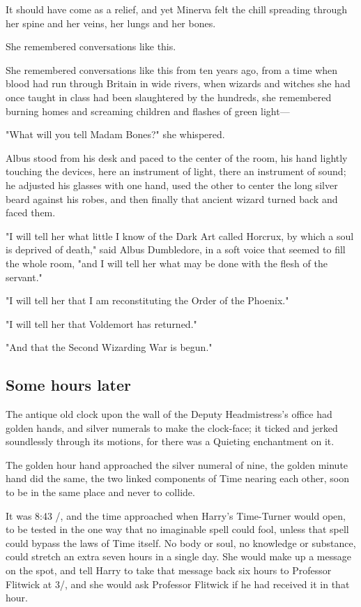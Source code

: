 It should have come as a relief, and yet Minerva felt the chill spreading
through her spine and her veins, her lungs and her bones.

She remembered conversations like this.

She remembered conversations like this from ten years ago, from a time when
blood had run through Britain in wide rivers, when wizards and witches she had
once taught in class had been slaughtered by the hundreds, she remembered
burning homes and screaming children and flashes of green light\mbox{---}

"What will you tell Madam Bones?" she whispered.

Albus stood from his desk and paced to the center of the room, his hand lightly
touching the devices, here an instrument of light, there an instrument of
sound; he adjusted his glasses with one hand, used the other to center the long
silver beard against his robes, and then finally that ancient wizard turned
back and faced them.

"I will tell her what little I know of the Dark Art called Horcrux, by which a
soul is deprived of death," said Albus Dumbledore, in a soft voice that seemed
to fill the whole room, "and I will tell her what may be done with the flesh of
the servant."

"I will tell her that I am reconstituting the Order of the Phoenix."

"I will tell her that Voldemort has returned."

"And that the Second Wizarding War is begun."
\sbreak
\vspace{-2\baselineskip}
\subsection{Some hours later{\el}}

The antique old clock upon the wall of the Deputy Headmistress's office had
golden hands, and silver numerals to make the clock-face; it ticked and jerked
soundlessly through its motions, for there was a Quieting enchantment on it.

The golden hour hand approached the silver numeral of nine, the golden minute
hand did the same, the two linked components of Time nearing each other, soon
to be in the same place and never to collide.

It was 8:43 \PM/, and the time approached when Harry's Time-Turner would open, to
be tested in the one way that no imaginable spell could fool, unless that spell
could bypass the laws of Time itself. No body or soul, no knowledge or
substance, could stretch an extra seven hours in a single day. She would make
up a message on the spot, and tell Harry to take that message back six hours to
Professor Flitwick at 3\PM/, and she would ask Professor Flitwick if he had
received it in that hour.


